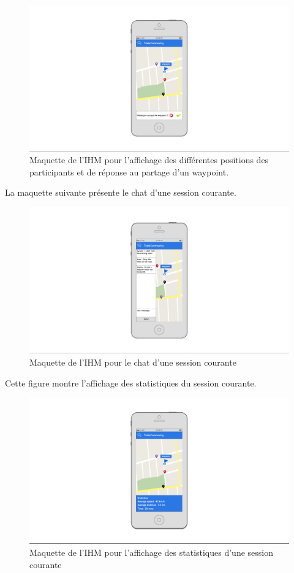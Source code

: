 \documentclass[titlepage, 12pt]{report}
\begin{document}
\begin{figure}[h]
	\caption{Maquette de l'IHM pour l'affichage des différentes positions des participants et de réponse au partage d'un waypoint.}
	\label{session_view}
	\centering
	\includegraphics[scale=0.2]{Images/mockups/session_marker.png}
\end{figure}

La maquette suivante présente le chat d'une session courante.

\begin{figure}[h]
	\caption{Maquette de l'IHM pour le chat d'une session courante}
	\label{chat}
	\centering
	\includegraphics[scale=0.2]{Images/mockups/chat.png}
\end{figure}

Cette figure montre l'affichage des statistiques du session courante.

\begin{figure}[h]
	\caption{Maquette de l'IHM pour l'affichage des statistiques d'une session courante}
	\label{login}
	\centering
	\includegraphics[scale=0.2]{Images/mockups/statistics.png}
\end{figure}
\end{document}
